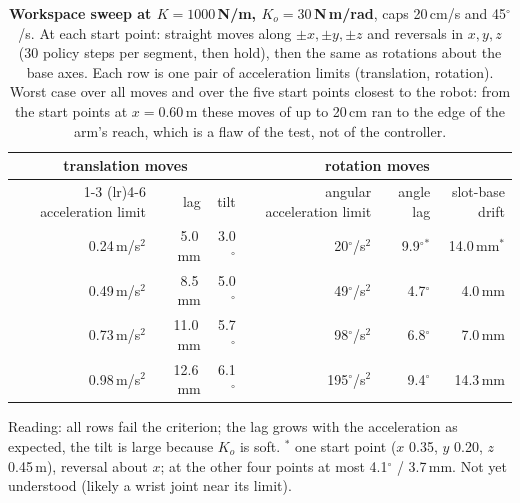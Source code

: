 \begin{table}[h]
  \centering
  \caption{\textbf{Workspace sweep at $K = 1000$\,N/m, $K_o = 30$\,N\,m/rad}, caps 20\,cm/s and 45$^\circ$/s. At each
  start point: straight moves along $\pm x, \pm y, \pm z$ and reversals in $x, y, z$ (30 policy steps per segment, then
  hold), then the same as rotations about the base axes. Each row is one pair of acceleration limits (translation,
  rotation). Worst case over all moves and over the five start points closest to the robot: from the start points at
  $x = 0.60$\,m these moves of up to 20\,cm ran to the edge of the arm's reach, which is a flaw of the test, not of the
  controller.}
  \label{tab:al-rot}
  {\renewcommand{\arraystretch}{1.15}
  \begin{tabular}{rrrrrr}
    \toprule
    \multicolumn{3}{c}{translation moves} & \multicolumn{3}{c}{rotation moves} \\
    \cmidrule(lr){1-3} \cmidrule(lr){4-6}
    acceleration limit & lag & tilt & angular acceleration limit & angle lag & slot-base drift \\
    \midrule
    0.24\,m/s$^2$ & 5.0\,mm  & 3.0$^\circ$ & 20$^\circ$/s$^2$  & 9.9$^\circ$$^*$ & 14.0\,mm$^*$ \\
    0.49\,m/s$^2$ & 8.5\,mm  & 5.0$^\circ$ & 49$^\circ$/s$^2$  & 4.7$^\circ$ & 4.0\,mm \\
    0.73\,m/s$^2$ & 11.0\,mm & 5.7$^\circ$ & 98$^\circ$/s$^2$  & 6.8$^\circ$ & 7.0\,mm \\
    0.98\,m/s$^2$ & 12.6\,mm & 6.1$^\circ$ & 195$^\circ$/s$^2$ & 9.4$^\circ$ & 14.3\,mm \\
    \bottomrule
  \end{tabular}}

  \smallskip
  {\small Reading: all rows fail the criterion; the lag grows with the acceleration as expected, the tilt is large
  because $K_o$ is soft. $^*$ one start point ($x$ 0.35, $y$ 0.20, $z$ 0.45\,m), reversal about $x$; at the other four
  points at most 4.1$^\circ$ / 3.7\,mm. Not yet understood (likely a wrist joint near its limit).}
\end{table}

